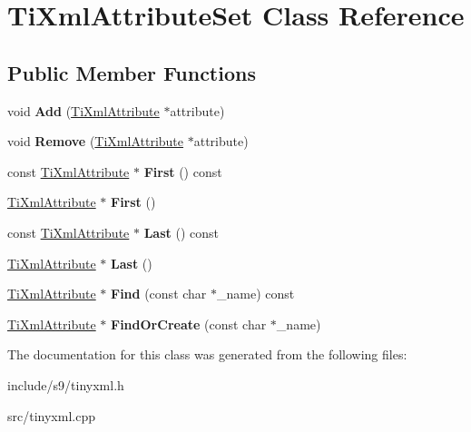 \hypertarget{classTiXmlAttributeSet}{\section{\-Ti\-Xml\-Attribute\-Set \-Class \-Reference}
\label{classTiXmlAttributeSet}
}
\subsection*{\-Public \-Member \-Functions}
\begin{DoxyCompactItemize}
\item 
\hypertarget{classTiXmlAttributeSet_a745e50ddaae3bee93e4589321e0b9c1a}{void {\bfseries \-Add} (\hyperlink{classTiXmlAttribute}{\-Ti\-Xml\-Attribute} $\ast$attribute)}\label{classTiXmlAttributeSet_a745e50ddaae3bee93e4589321e0b9c1a}

\item 
\hypertarget{classTiXmlAttributeSet_a924a73d071f2573f9060f0be57879c57}{void {\bfseries \-Remove} (\hyperlink{classTiXmlAttribute}{\-Ti\-Xml\-Attribute} $\ast$attribute)}\label{classTiXmlAttributeSet_a924a73d071f2573f9060f0be57879c57}

\item 
\hypertarget{classTiXmlAttributeSet_ae0636e88cedd4b09d61c451860f68598}{const \hyperlink{classTiXmlAttribute}{\-Ti\-Xml\-Attribute} $\ast$ {\bfseries \-First} () const }\label{classTiXmlAttributeSet_ae0636e88cedd4b09d61c451860f68598}

\item 
\hypertarget{classTiXmlAttributeSet_a99703bb08ca2aece2d7ef835de339ba0}{\hyperlink{classTiXmlAttribute}{\-Ti\-Xml\-Attribute} $\ast$ {\bfseries \-First} ()}\label{classTiXmlAttributeSet_a99703bb08ca2aece2d7ef835de339ba0}

\item 
\hypertarget{classTiXmlAttributeSet_a7b3f3ccf39a97bc25539d3fcc540296a}{const \hyperlink{classTiXmlAttribute}{\-Ti\-Xml\-Attribute} $\ast$ {\bfseries \-Last} () const }\label{classTiXmlAttributeSet_a7b3f3ccf39a97bc25539d3fcc540296a}

\item 
\hypertarget{classTiXmlAttributeSet_ab4c4edfb2d74f6ea31aae096743bd6e0}{\hyperlink{classTiXmlAttribute}{\-Ti\-Xml\-Attribute} $\ast$ {\bfseries \-Last} ()}\label{classTiXmlAttributeSet_ab4c4edfb2d74f6ea31aae096743bd6e0}

\item 
\hypertarget{classTiXmlAttributeSet_af3675cc2bfd0aea153cda1cfcdd1f77e}{\hyperlink{classTiXmlAttribute}{\-Ti\-Xml\-Attribute} $\ast$ {\bfseries \-Find} (const char $\ast$\-\_\-name) const }\label{classTiXmlAttributeSet_af3675cc2bfd0aea153cda1cfcdd1f77e}

\item 
\hypertarget{classTiXmlAttributeSet_a5e28f5d32f048fba85d04dc317495bdc}{\hyperlink{classTiXmlAttribute}{\-Ti\-Xml\-Attribute} $\ast$ {\bfseries \-Find\-Or\-Create} (const char $\ast$\-\_\-name)}\label{classTiXmlAttributeSet_a5e28f5d32f048fba85d04dc317495bdc}

\end{DoxyCompactItemize}


\-The documentation for this class was generated from the following files\-:\begin{DoxyCompactItemize}
\item 
include/s9/tinyxml.\-h\item 
src/tinyxml.\-cpp\end{DoxyCompactItemize}
